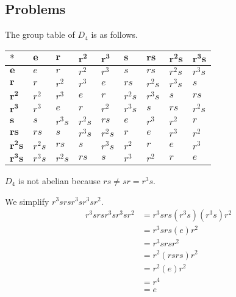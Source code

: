 \subsection*{Problems}
\begin{questions}
    \item The group table of $D_4$ is as follows.
    \begin{table}[H]
        \centering
        \begin{tabular}{|l|l|l|l|l|l|l|l|l|}
        \hline
        $\ast$ & $\boldsymbol{e}$    & $\boldsymbol{r}$    & $\boldsymbol{r^2}$  & $\boldsymbol{r^3}$  & $\boldsymbol{s}$    & $\boldsymbol{rs}$   & $\boldsymbol{r^2s}$ & $\boldsymbol{r^3s}$ \\ \hline
        $\boldsymbol{e}$    & $e$    & $r$    & $r^2$  & $r^3$  & $s$    & $rs$   & $r^2s$ & $r^3s$ \\ \hline
        $\boldsymbol{r}$    & $r$    & $r^2$  & $r^3$  & $e$    & $rs$   & $r^2s$ & $r^3s$ & $s$    \\ \hline
        $\boldsymbol{r^2}$  & $r^2$  & $r^3$  & $e$    & $r$    & $r^2s$ & $r^3s$ & $s$    & $rs$   \\ \hline
        $\boldsymbol{r^3}$  & $r^3$  & $e$    & $r$    & $r^2$  & $r^3s$ & $s$    & $rs$   & $r^2s$ \\ \hline
        $\boldsymbol{s}$    & $s$    & $r^3s$ & $r^2s$ & $rs$   & $e$    & $r^3$  & $r^2$  & $r$    \\ \hline
        $\boldsymbol{rs}$   & $rs$   & $s$    & $r^3s$ & $r^2s$ & $r$    & $e$    & $r^3$  & $r^2$  \\ \hline
        $\boldsymbol{r^2s}$ & $r^2s$ & $rs$   & $s$    & $r^3s$ & $r^2$  & $r$    & $e$    & $r^3$  \\ \hline
        $\boldsymbol{r^3s}$ & $r^3s$ & $r^2s$ & $rs$   & $s$    & $r^3$  & $r^2$  & $r$    & $e$    \\ \hline
        \end{tabular}
    \end{table}
    \begin{partquestions}{\alph*}
        \item $D_4$ is not abelian because $rs \neq sr = r^3s$.
        \item We simplify $r^3srsr^3sr^3sr^2$.
        \begin{align*}
            r^3 sr sr^3 sr^3 sr^2 &= r^3srs(r^3s)(r^3s)r^2\\
            &= r^3 srs(e)r^2\\
            &= r^3 sr sr^2\\
            &= r^2(rs rs)r^2\\
            &= r^2(e)r^2\\
            &= r^4\\
            &= e
        \end{align*}
    \end{partquestions}


\end{questions}
